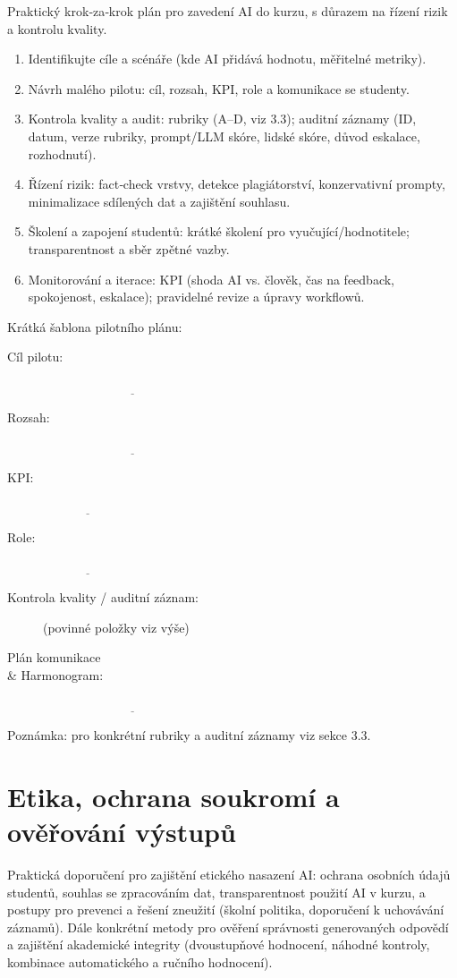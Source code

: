 \documentclass{report}%
\begin{document}
%
Praktický krok‑za‑krok plán pro zavedení AI do kurzu, s důrazem na řízení rizik a kontrolu kvality.

\begin{enumerate}
\item Identifikujte cíle a scénáře (kde AI přidává hodnotu, měřitelné metriky).
\item Návrh malého pilotu: cíl, rozsah, KPI, role a komunikace se studenty.
\item Kontrola kvality a audit: rubriky (A–D, viz 3.3); auditní záznamy (ID, datum, verze rubriky, prompt/LLM skóre, lidské skóre, důvod eskalace, rozhodnutí).
\item Řízení rizik: fact‑check vrstvy, detekce plagiátorství, konzervativní prompty, minimalizace sdílených dat a zajištění souhlasu.
\item Školení a zapojení studentů: krátké školení pro vyučující/hodnotitele; transparentnost a sběr zpětné vazby.
\item Monitorování a iterace: KPI (shoda AI vs. člověk, čas na feedback, spokojenost, eskalace); pravidelné revize a úpravy workflowů.
\end{enumerate}

Krátká šablona pilotního plánu:
\begin{description}
\item[Cíl pilotu:] $\underline{\hspace{6cm}}$ \item[Rozsah:] $\underline{\hspace{6cm}}$ \item[KPI:] $\underline{\hspace{3cm}}$ \item[Role:] $\underline{\hspace{3cm}}$
\item[Kontrola kvality / auditní záznam:] (povinné položky viz výše) \item[Plán komunikace \\ \& Harmonogram:] $\underline{\hspace{6cm}}$
\end{description}
Poznámka: pro konkrétní rubriky a auditní záznamy viz sekce 3.3.%

%
\chapter{Etika, ochrana soukromí a ověřování výstupů}%
Praktická doporučení pro zajištění etického nasazení AI: ochrana osobních údajů studentů, souhlas se zpracováním dat, transparentnost použití AI v kurzu, a postupy pro prevenci a řešení zneužití (školní politika, doporučení k uchovávání záznamů). Dále konkrétní metody pro ověření správnosti generovaných odpovědí a zajištění akademické integrity (dvoustupňové hodnocení, náhodné kontroly, kombinace automatického a ručního hodnocení).%
\end{document}
